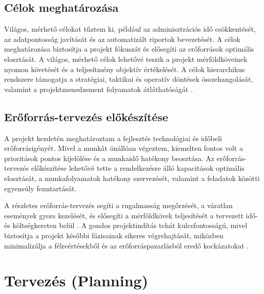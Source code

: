 \subsection{Célok meghatározása}

Világos, mérhető célokat tűztem ki, például az adminisztrációs idő csökkentését, az adatpontosság javítását és az automatizált riportok bevezetését.  
A célok meghatározása biztosítja a projekt fókuszát és elősegíti az erőforrások optimális elosztását.  
A világos, mérhető célok lehetővé teszik a projekt mérföldköveinek nyomon követését és a teljesítmény objektív értékelését.  
A célok hierarchikus rendszere támogatja a stratégiai, taktikai és operatív döntések összehangolását, valamint a projektmenedzsment folyamatok átláthatóságát \cite{Hajdu2014,Szalay2018}.

\subsection{Erőforrás-tervezés előkészítése}

A projekt kezdetén meghatároztam a fejlesztés technológiai és időbeli erőforrásigényét.  
Mivel a munkát önállóan végeztem, kiemelten fontos volt a prioritások pontos kijelölése és a munkaidő hatékony beosztása.  
Az erőforrás-tervezés előkészítése lehetővé tette a rendelkezésre álló kapacitások optimális elosztását,  
a munkafolyamatok hatékony szervezését, valamint a feladatok közötti egyensúly fenntartását.  

A részletes erőforrás-tervezés segíti a rugalmasság megőrzését, a váratlan események gyors kezelését,  
és elősegíti a mérföldkövek teljesítését a tervezett idő- és költségkereten belül \cite{Kovacs2016,Kaposi2019,Hajdu2014}.  
A gondos projektindítás tehát kulcsfontosságú, mivel biztosítja a projekt későbbi fázisainak sikeres végrehajtását,  
miközben minimalizálja a félreértésekből és az erőforráspazarlásból eredő kockázatokat \cite{Szalay2018}.

\section{Tervezés (Planning)}

